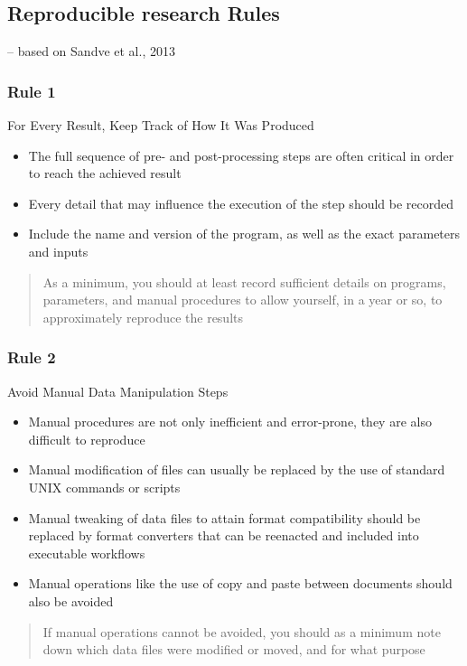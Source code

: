 \documentclass{beamer}
\begin{document}
\begin{frame}
\section{Reproducible research Rules}
\vspace{30pt}
\scriptsize  
\raggedleft -- based on Sandve et al., 2013 \citep{Sandve:2013gh}
\end{frame}
\begin{frame}
\frametitle{Rule 1}
\small{\sc For Every Result, Keep Track of How It Was Produced}
\begin{itemize}
    \item  The full sequence of pre- and post-processing steps are often critical in order to reach the achieved result
    \item Every detail that may influence the execution of the step should be recorded
    \item Include the name and version of the program, as well as the exact parameters and inputs
\end{itemize}
\begin{quote}As a minimum, you should at least record sufficient details on programs, parameters, and manual procedures to allow yourself, in a year or so, to approximately reproduce the results\end{quote}
\end{frame}
\begin{frame}
\frametitle{Rule 2}
\small{\sc Avoid Manual Data Manipulation Steps}
\begin{itemize}
    \item Manual procedures are not only inefficient and error-prone, they are also difficult to reproduce
    \item Manual modification of files can usually be replaced by the use of standard UNIX commands or scripts
    \item Manual tweaking of data files to attain format compatibility should be replaced by format converters that can be reenacted and included into executable workflows
    \item Manual operations like the use of copy and paste between documents should also be avoided
\end{itemize}
\begin{quote}
If manual operations cannot be avoided, you should as a minimum note down which data files were modified or moved, and for what purpose
\end{quote}

\end{frame}
\end{document}
